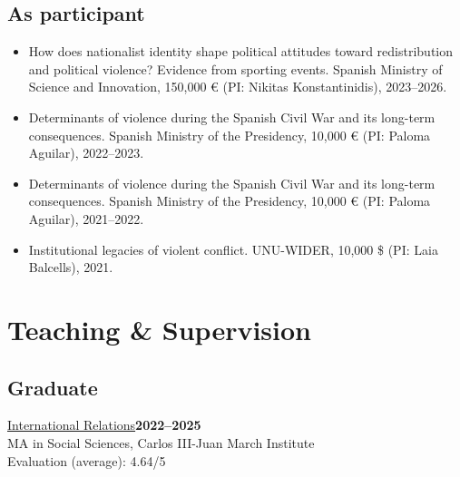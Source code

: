 \documentclass[a4paper, 12pt]{article}
\begin{document}
\subsection*{As participant}

\begin{itemize}[leftmargin=12pt, itemsep=0pt]
	\item How does nationalist identity shape political attitudes toward redistribution and political violence? Evidence from sporting events. Spanish Ministry of Science and Innovation, 150,000 € (PI: Nikitas Konstantinidis), 2023--2026. %
	\item Determinants of violence during the Spanish Civil War and its long-term consequences. Spanish Ministry of the Presidency, 10,000 € (PI: Paloma Aguilar), 2022--2023. %
	\item Determinants of violence during the Spanish Civil War and its long-term consequences. Spanish Ministry of the Presidency, 10,000 € (PI: Paloma Aguilar), 2021--2022. %
	\item Institutional legacies of violent conflict. UNU-WIDER, 10,000 \$ (PI: Laia Balcells), 2021.
\end{itemize}

\section*{Teaching \& Supervision}


\subsection*{Graduate}

\noindent
\href{https://raw.githack.com/franvillamil/syllabi/master/current/syllabus_IR.pdf}{International Relations}\hfill\textbf{2022--2025}\\
{\small MA in Social Sciences, Carlos III-Juan March Institute}\\
{\small Evaluation (average): 4.64/5} %
\vspace{10pt}
\end{document}
